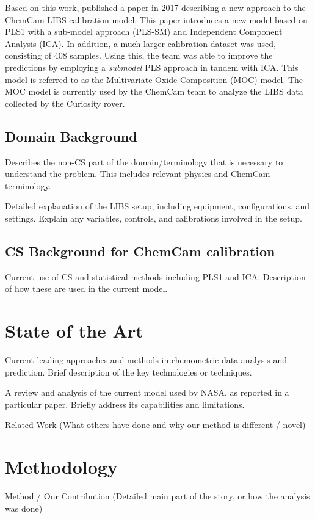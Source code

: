 Based on this work, \citeauthor{cleggRecalibrationMarsScience2017} published a paper in 2017 describing a new approach to the ChemCam LIBS calibration model.
This paper introduces a new model based on PLS1 with a sub-model approach (PLS-SM) and Independent Component Analysis (ICA).
In addition, a much larger calibration dataset was used, consisting of 408 samples.
Using this, the team was able to improve the predictions by employing a \textit{submodel} PLS approach in tandem with ICA.
This model is referred to as the Multivariate Oxide Composition (MOC) model.
The MOC model is currently used by the ChemCam team to analyze the LIBS data collected by the Curiosity rover.

\subsection{Domain Background}
Describes the non-CS part of the domain/terminology that is necessary to understand the problem.
This includes relevant physics and ChemCam terminology.

Detailed explanation of the LIBS setup, including equipment, configurations, and settings.
Explain any variables, controls, and calibrations involved in the setup.

\subsection{CS Background for ChemCam calibration}
Current use of CS and statistical methods including PLS1 and ICA.
Description of how these are used in the current model.

\section{State of the Art}
Current leading approaches and methods in chemometric data analysis and prediction.
Brief description of the key technologies or techniques.

A review and analysis of the current model used by NASA, as reported in a particular paper.
Briefly address its capabilities and limitations.

Related Work (What others have done and why our method is different / novel)

\section{Methodology}
Method / Our Contribution (Detailed main part of the story, or how the analysis was done)

